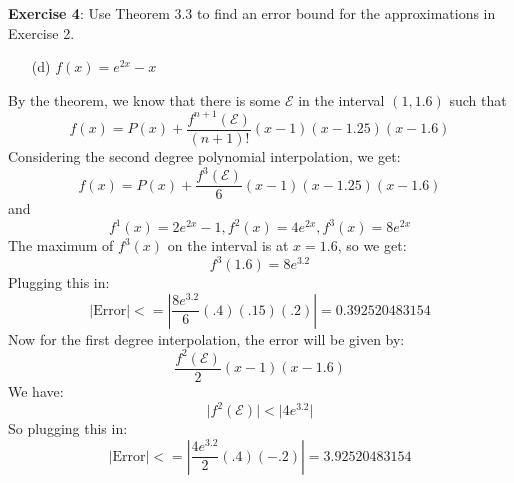 \documentclass{article}
\begin{document}
\textbf{Exercise 4}: Use Theorem $3.3$ to find an error bound for the approximations in Exercise 2.
    \begin{itemize}
        \item [(d)] $f(x) = e^{2x} - x$ 
    \end{itemize}
    \begin{answer}
        By the theorem, we know that there is some $\mathcal{E}$ in the interval $(1, 1.6)$ such that
            \begin{equation*}
                f(x) = P(x) + \dfrac{f^{n + 1}(\mathcal{E})}{(n + 1)!}(x - 1)(x - 1.25)(x - 1.6)
            \end{equation*}
        Considering the second degree polynomial interpolation, we get:
            \begin{equation*}
                f(x) = P(x) + \dfrac{f^{3}(\mathcal{E})}{6}(x - 1)(x - 1.25)(x - 1.6)
            \end{equation*}
        and 
            \begin{equation*}
                f^{1}(x) = 2e^{2x} - 1, f^{2}(x) = 4e^{2x}, f^{3}(x) = 8e^{2x}
            \end{equation*}
        The maximum of $f^{3}(x)$ on the interval is at $x = 1.6$, so we get:
            \begin{equation*}
                f^{3}(1.6) = 8e^{3.2}
            \end{equation*}
        Plugging this in:
            \begin{equation*}
                \lvert \text{Error} \rvert <= \left\lvert \dfrac{8e^{3.2}}{6}(.4)(.15)(.2) \right\rvert = 0.392520483154
            \end{equation*}
        Now for the first degree interpolation, the error will be given by:
            \begin{equation*}
                \dfrac{f^{2}(\mathcal{E})}{2}(x - 1)(x - 1.6)
            \end{equation*}
        We have:
            \begin{equation*}
                \lvert f^{2}(\mathcal{E}) \rvert < \lvert 4e^{3.2} \rvert
            \end{equation*}
        So plugging this in:
            \begin{equation*}
                \lvert \text{Error} \rvert <= \left\lvert \dfrac{4e^{3.2}}{2}(.4)(-.2) \right\rvert = 3.92520483154
            \end{equation*}
    \end{answer}
\end{document}

